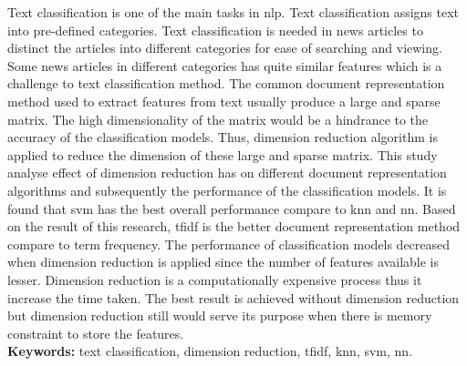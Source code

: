 Text classification is one of the main tasks in \ac{nlp}. Text classification assigns text into pre-defined categories. Text classification is needed in news articles to distinct the articles into different categories for ease of searching and viewing. Some news articles in different categories has quite similar features which is a challenge to text classification method. The common document representation method used to extract features from text usually produce a large and sparse matrix. The high dimensionality of the matrix would be a hindrance to the accuracy of the classification models. Thus, dimension reduction algorithm is applied to reduce the dimension of these large and sparse matrix. This study analyse effect of dimension reduction has on different document representation algorithms and subsequently the performance of the classification models. It is found that \ac{svm} has the best overall performance compare to \ac{knn} and \ac{nn}. Based on the result of this research, \ac{tfidf} is the better document representation method compare to term frequency. The performance of classification models decreased when dimension reduction is applied since the number of features available is lesser. Dimension reduction is a computationally expensive process thus it increase the time taken. The best result is achieved without dimension reduction but dimension reduction still would serve its purpose when there is memory constraint to store the features. \\

\textbf{Keywords: } text classification, dimension reduction, \ac{tfidf}, \ac{knn}, \ac{svm}, \ac{nn}.
